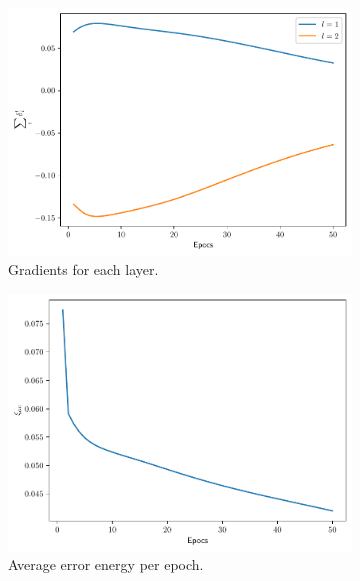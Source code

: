 \documentclass[conference]{IEEEtran}
\theoremstyle{definition}
\theoremstyle{remark}
\theoremstyle{remark}
\begin{document}
\begin{figure}
    \centering
    \begin{subfigure}[b]{0.32\textwidth}
        \centering
        \includegraphics[width=\textwidth]{figs/3-0.9-gradients.pdf}
        \caption{Gradients for each layer.}
    \end{subfigure}
    \begin{subfigure}[b]{0.32\textwidth}
        \centering
        \includegraphics[width=\textwidth]{figs/3-0.9-error.pdf}
        \caption{Average error energy per epoch.}
    \end{subfigure}
    \begin{subfigure}[b]{0.32\textwidth}
        \centering

\end{subfigure}
\end{figure}
\end{document}
